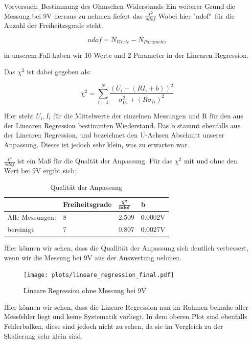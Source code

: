 \documentclass[twoside]{protokoll}
\begin{document}
\begin{aufgabe}{Vorversuch: Bestimmung des Ohmschen Widerstands}
Ein weiterer Grund die Messung bei 9V herraus zu nehmen liefert das $\frac{\chi^2}{ndof}$ Wobei hier "ndof"\ für die Anzahl der Freiheitzsgrade steht.

\begin{equation}
ndof = N_{Werte} - N_{Parameter}
\end{equation}

in unserem Fall haben wir 10 Werte und 2 Parameter in der Linearen Regression.

Das $\chi^2$ ist dabei gegeben als:

\begin{equation}
	\chi^2 = \sum_{i=1}^N \frac{(U_i - (RI_i + b))^2}{\sigma_{Ui}^2+(R\sigma_{Ii})^2}
\end{equation}

Hier steht $ U_i , I_i $ für die Mittelwerte der einzelnen Messungen und R für den aus der Linearen Regression bestimmten Wiederstand. 
Das b stammt ebenfalls aus der Linearen Regression, und bezeichnet den U-Achsen Abschnitt unserer Anpassung. Dieses ist jedoch sehr klein, was zu erwarten war.
 
$\frac{\chi^2}{ndof}$ ist ein Maß für die Qualtät der Anpassung.  
Für das $\chi^2$ mit und ohne den Wert bei 9V ergibt sich:

\begin{table}[H]
    \centering
    \begin{tabularx}{1\textwidth}{X X X X}
        \toprule
         & \textbf{Freiheitsgrade} & $\pmb{\frac{\chi^2}{ndof}}$ & \textbf{b} \\
        \midrule
        Alle Messungen: & 8 & 2.509 & 0.0002V \\
         bereinigt & 7 & 0.807 & 0.0027V \\

        \bottomrule
    \end{tabularx}
    \caption{Qualität der Anpassung}
    \label{tab:mytable}
  \end{table}

Hier können wir sehen, dass die Quallität der Anpassung sich deutlich verbessert, wenn wir die Messung bei 9V aus der Auswertung nehmen.
 
 \begin{figure}[H]
  \centering
  \texttt{[image: plots/lineare\_regression\_final.pdf]}
  \caption{Lineare Regression ohne Messung bei 9V}
  \centering
  \end{figure}

Hier können wir sehen, dass die Lineare Regression nun im Rahmen beinahe aller Messfehler liegt und keine Systematik vorliegt.
In dem oberen Plot sind ebenfalls Fehlerbalken, diese sind jedoch nicht zu sehen, da sie im Vergleich zu der Skalierung sehr klein sind.\\


\end{aufgabe}
\end{document}
